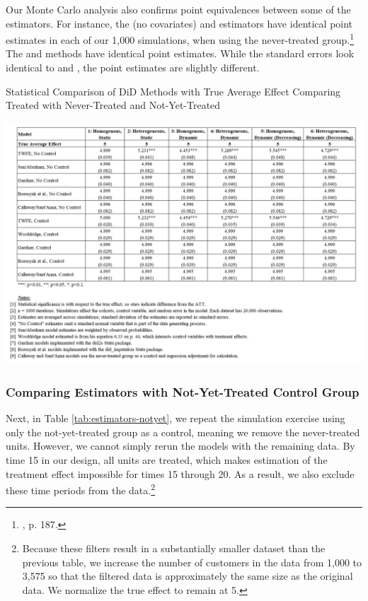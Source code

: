 \documentclass[12pt]{article}
\begin{document}
Our Monte Carlo analysis also confirms point equivalences between some of the estimators. For instance, the \citet{CS2021} (no covariates) and \citet{sunabr2021a} estimators have identical point estimates in each of our 1,000 simulations, when using the never-treated group.\footnote{\citet{sunabr2021a}, p. 187.}  The \citet{gardner2022a} and \citet{borusyak2024revisiting} methods have identical point estimates. While the \citet{wooldridge2021two} standard errors look identical to \citet{gardner2022a} and \citet{borusyak2024revisiting}, the point estimates are slightly different.
\begin{table}[H]
    \centering
    \caption{Statistical Comparison of DiD Methods with True Average Effect
Comparing Treated with Never-Treated and Not-Yet-Treated}
    \includegraphics[width=6in]{Figures/Table 1.png}
    \label{tab:estimators-never}
\end{table}

\subsubsection{Comparing Estimators with Not-Yet-Treated Control Group}
Next, in Table \ref{tab:estimators-notyet}, we repeat the simulation exercise using only the not-yet-treated group as a control, meaning we remove the never-treated units. However, we cannot simply rerun the models with the remaining data. By time 15 in our design, all units are treated, which makes estimation of the treatment effect impossible for times 15 through 20. As a result, we also exclude these time periods from the data.\footnote{Because these filters result in a substantially smaller dataset than the previous table, we increase the number of customers in the data from 1,000 to 3,575 so that the filtered data is approximately the same size as the original data. We normalize the true effect to remain at 5.} 
\end{document}
